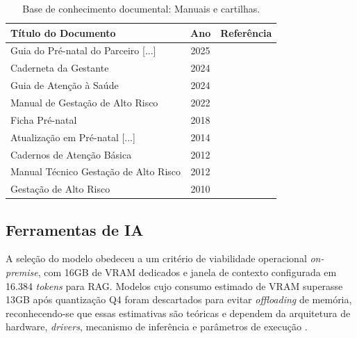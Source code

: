\documentclass[12pt]{article}
\begin{document}
\begin{table}[H]
  \centering
  \caption{Base de conhecimento documental: Manuais e cartilhas.}
  \label{tab:cartilhas_sus}
  \footnotesize
  \begin{tabular}{l c l}
    \toprule
        \textbf{Título do Documento} & \textbf{Ano} & \textbf{Referência} \\ 
    \midrule
        Guia do Pré-natal do Parceiro [...]     & 2025 & \cite{GuiaPreNatalParceiro2025} \\
        Caderneta da Gestante                   & 2024 & \cite{CadernetaGestante2024} \\
        Guia de Atenção à Saúde                 & 2024 & \cite{GuiaAtencaoGestanteMG2024} \\
        Manual de Gestação de Alto Risco        & 2022 & \cite{ManualAltoRisco2022} \\
        Ficha Pré-natal                         & 2018 & \cite{FichaPreNatal2018} \\
        Atualização em Pré-natal [...]          & 2014 & \cite{AtualizacaoPreNatalSC2014} \\
        Cadernos de Atenção Básica              & 2012 & \cite{CadernosAtencaoBasica32} \\
        Manual Técnico Gestação de Alto Risco   & 2012 & \cite{ManualAltoRisco2012} \\
        Gestação de Alto Risco                  & 2010 & \cite{ManualAltoRisco2010} \\
    \bottomrule
  \end{tabular}
\end{table}

\subsection{Ferramentas de IA}

A seleção do modelo obedeceu a um critério de viabilidade operacional \textit{on-premise}, com 16GB de VRAM dedicados e janela de contexto configurada em 16.384 \textit{tokens} para RAG.
Modelos cujo consumo estimado de VRAM superasse 13GB após quantização Q4 foram descartados para evitar \textit{offloading} de memória, reconhecendo-se que essas estimativas são teóricas e dependem da arquitetura de hardware, \textit{drivers}, mecanismo de inferência e parâmetros de execução \cite{VRAMCalculator}.
\end{document}

